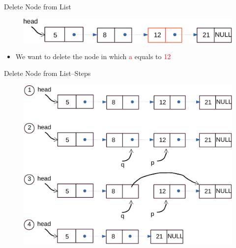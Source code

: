 \begin{frame}[fragile]{Delete Node from List}
\vspace{0.2in}
\begin{figure}
\begin{center}
	\includegraphics[width=0.6\linewidth]{figs/list_delete_step1.pdf}
\end{center}
\end{figure}
\begin{itemize}
	\item {We want to delete the node in which \textcolor{red}{a} equals to \textcolor{red}{12}}
\end{itemize}

\end{frame}

\begin{frame}[fragile]{Delete Node from List--Steps}
\begin{figure}
\begin{center}
	\includegraphics[width=0.75\linewidth]{figs/list_delete.pdf}
\end{center}
\end{figure}

\end{frame}


